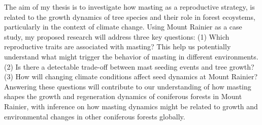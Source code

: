 \documentclass[11pt,letter]{article}
\begin{document}
The aim of my thesis is to investigate how masting as a reproductive strategy, is related to the growth dynamics of tree species and their role in forest ecoystems, particularly in the context of climate change. Using Mount Rainier as a case study, my proposed research will address three key questions: (1) Which reproductive traits are associated with masting? This help us potentially understand what might trigger the behavior of masting in different environments. (2) Is there a detectable trade-off between mast seeding events and tree growth? (3) How will changing climate conditions affect seed dynamics at Mount Rainier? Answering these questions will contribute to our understanding of how masting shapes the growth and regeneration dynamics of coniferous forests in Mount Rainier, with inference on how masting dynamics might be related to growth and environmental changes in other coniferous forests globally.\par
\end{document}
